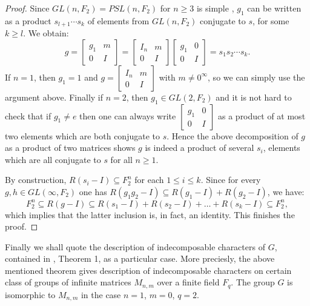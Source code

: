 \documentclass[11pt]{amsart}
\theoremstyle{plain}
\theoremstyle{definition}
\theoremstyle{remark}
\numberwithin{equation}{section}
\begin{document}
\begin{proof}
Since $GL(n,F_2)=PSL(n, F_2)$ for $n\geq 3$ is simple \cite[Chapter 8]{Rotman_book}, $g_1$ can be written as a product $s_{l+1}\cdots s_k$ of elements from $GL(n,F_2)$ conjugate to $s$, for some $k\geqslant l$. We obtain:
		$$g=\begin{bmatrix}
			g_1 & m \\0 &I
		\end{bmatrix}=
		\begin{bmatrix}
			I_n&m\\0&I
		\end{bmatrix}
		\begin{bmatrix}
			g_1 & 0\\0 & I
		\end{bmatrix}=s_1s_2\cdots s_k.$$
If $n=1$, then $g_1=1$ and $g=\begin{bmatrix}
			I_n&m\\0&I
		\end{bmatrix}$ 
with $m \neq 0^\infty$, so we can simply use the argument above. Finally if $n=2$, then $g_1\in GL(2, F_2)$ and it is not hard to check that if $g_1 \neq e$ then one can always write  
$\begin{bmatrix}
			g_1 & 0\\0 & I
		\end{bmatrix}$ 
as a product of at most two elements which are both conjugate to $s$. Hence the above decomposition of $g$ as a product of two matrices shows $g$ is indeed a product of several $s_i$, elements which are all conjugate to $s$ for all $n\geq 1$.
		
		
By construction, $R(s_i-I)\subseteq F_2^n$ for each $1\leqslant i\leqslant k$. Since for every $g,h\in GL(\infty,F_2)$ one has $R(g_1g_2-I)\subseteq R(g_1-I)+R(g_2-I)$, we have:
$$F_2^n\subseteq R(g-I)\subseteq R(s_1-I)+R(s_2-I)+\ldots+R(s_k-I)\subseteq F_2^n,$$ 
which implies that the latter inclusion is, in fact, an identity. This finishes the proof.
	\end{proof}


Finally we shall quote the description of indecomposable characters of $G$, contained in  \cite{Dudko-2008}, Theorem 1, as a particular case. More preciesly, the above mentioned theorem gives description of indecomposable characters on certain class of groups of infinite matrices $M_{n,m}$ over a finite field $F_q$. The group $G$ is isomorphic to $M_{n,m}$ in the case $n=1$, $m=0$, $q=2$. 
\end{document}
